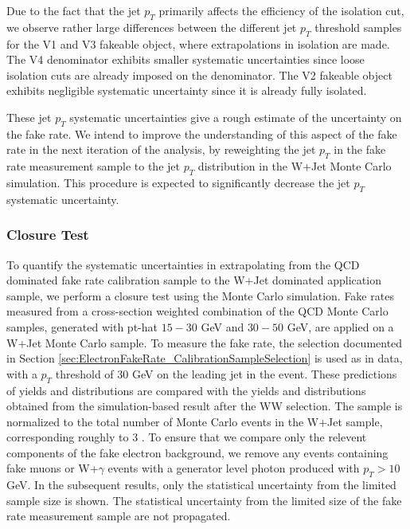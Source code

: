 Due to the fact that the jet $p_{T}$ primarily affects the efficiency of the isolation cut,
we observe rather large differences between the different jet $p_{T}$ threshold samples
for the V1 and V3 fakeable object, where extrapolations in isolation are made. The V4 
denominator exhibits smaller systematic uncertainties since loose isolation cuts are 
already imposed on the denominator. The V2 fakeable object exhibits negligible 
systematic uncertainty since it is already fully isolated. 

These jet $p_{T}$ systematic uncertainties give a rough estimate of the uncertainty on the fake rate. 
We intend to improve the understanding of this aspect of the fake rate in the next iteration of the
analysis, by reweighting the jet $p_{T}$ in the fake rate measurement sample to the 
jet $p_{T}$ distribution in the W+Jet Monte Carlo
simulation. This procedure is expected to significantly decrease the jet $p_{T}$ systematic
uncertainty.






 \subsubsection{Closure Test}
 To quantify the systematic uncertainties in extrapolating from the QCD dominated fake rate
calibration sample to the W+Jet dominated application sample, we perform a closure test using 
the Monte Carlo simulation. Fake rates measured from a cross-section weighted combination of 
the QCD Monte Carlo samples, generated with pt-hat $15-30$ GeV and $30-50$ GeV, are applied on
a W+Jet Monte Carlo sample. To measure the fake rate, the selection documented in Section
\ref{sec:ElectronFakeRate_CalibrationSampleSelection} is used as in data, with a $p_{T}$ 
threshold of $30$ GeV on the leading jet in the event. These predictions of yields and 
distributions are compared with the yields and distributions obtained from the 
simulation-based result after the WW selection. The sample is normalized to the 
total number of Monte Carlo events in the W+Jet sample, corresponding roughly to $3$ \ifb.
To ensure that we compare only the relevent components of the fake electron background,
we remove any events containing fake muons or W+$\gamma$ events with a generator level photon 
produced with $p_{T} > 10$ GeV. In the subsequent results, only the statistical uncertainty 
from the limited sample size is shown. The statistical uncertainty from the limited size of 
the fake rate measurement sample are not propagated. 

